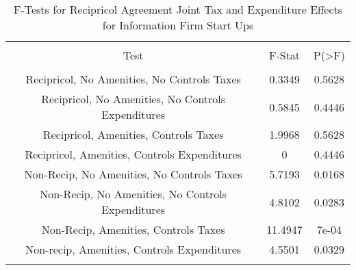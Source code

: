 
\begin{table}[!htbp] \centering 
  \caption{F-Tests for Recipricol Agreement Joint Tax and Expenditure Effects for Information Firm Start Ups} 
  \label{51Ftests} 
\begin{tabular}{@{\extracolsep{5pt}} ccc} 
\\[-1.8ex]\hline 
\hline \\[-1.8ex] 
Test & F-Stat & P(\textgreater F) \\ 
\hline \\[-1.8ex] 
Recipricol, No Amenities, No Controls Taxes & 0.3349 & 0.5628 \\ 
Recipricol, No Amenities, No Controls Expenditures & 0.5845 & 0.4446 \\ 
Recipricol, Amenities, Controls Taxes & 1.9968 & 0.5628 \\ 
Recipricol, Amenities, Controls Expenditures & 0 & 0.4446 \\ 
Non-Recip, No Amenities, No Controls Taxes & 5.7193 & 0.0168 \\ 
Non-Recip, No Amenities, No Controls Expenditures & 4.8102 & 0.0283 \\ 
Non-Recip, Amenities, Controls Taxes & 11.4947 & 7e-04 \\ 
Non-recip, Amenities, Controls Expenditures & 4.5501 & 0.0329 \\ 
\hline \\[-1.8ex] 
\end{tabular} 
\end{table} 
